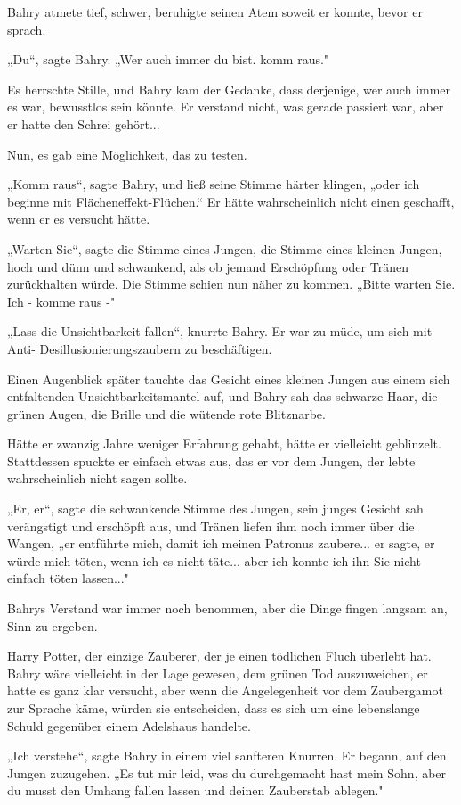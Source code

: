 {Bahry atmete tief, schwer, beruhigte seinen Atem soweit er konnte, bevor er sprach.

„Du“, sagte Bahry. „Wer auch immer du bist. komm raus."

Es herrschte Stille, und Bahry kam der Gedanke, dass derjenige, wer auch immer es war, bewusstlos sein könnte. Er verstand nicht, was gerade passiert war, aber er hatte den Schrei gehört...

Nun, es gab eine Möglichkeit, das zu testen.

„Komm raus“, sagte Bahry, und ließ seine Stimme härter klingen, „oder ich beginne mit Flächeneffekt-Flüchen.“ Er hätte wahrscheinlich nicht einen geschafft, wenn er es versucht hätte.

„Warten Sie“, sagte die Stimme eines Jungen, die Stimme eines kleinen Jungen, hoch und dünn und schwankend, als ob jemand Erschöpfung oder Tränen zurückhalten würde. Die Stimme schien nun näher zu kommen. „Bitte warten Sie. Ich - komme raus -"

„Lass die Unsichtbarkeit fallen“, knurrte Bahry. Er war zu müde, um sich mit Anti- Desillusionierungszaubern zu beschäftigen.

Einen Augenblick später tauchte das Gesicht eines kleinen Jungen aus einem sich entfaltenden Unsichtbarkeitsmantel auf, und Bahry sah das schwarze Haar, die grünen Augen, die Brille und die wütende rote Blitznarbe.

Hätte er zwanzig Jahre weniger Erfahrung gehabt, hätte er vielleicht geblinzelt. Stattdessen spuckte er einfach etwas aus, das er vor dem Jungen, der lebte wahrscheinlich nicht sagen sollte.

„Er, er“, sagte die schwankende Stimme des Jungen, sein junges Gesicht sah verängstigt und erschöpft aus, und Tränen liefen ihm noch immer über die Wangen, „er entführte mich, damit ich meinen Patronus zaubere... er sagte, er würde mich töten, wenn ich es nicht täte... aber ich konnte ich ihn Sie nicht einfach töten lassen..."

Bahrys Verstand war immer noch benommen, aber die Dinge fingen langsam an, Sinn zu ergeben.

Harry Potter, der einzige Zauberer, der je einen tödlichen Fluch überlebt hat. Bahry wäre vielleicht in der Lage gewesen, dem grünen Tod auszuweichen, er hatte es ganz klar versucht, aber wenn die Angelegenheit vor dem Zaubergamot zur Sprache käme, würden sie entscheiden, dass es sich um eine lebenslange Schuld gegenüber einem Adelshaus handelte.

„Ich verstehe“, sagte Bahry in einem viel sanfteren Knurren. Er begann, auf den Jungen zuzugehen. „Es tut mir leid, was du durchgemacht hast mein Sohn, aber du musst den Umhang fallen lassen und deinen Zauberstab ablegen."

}
